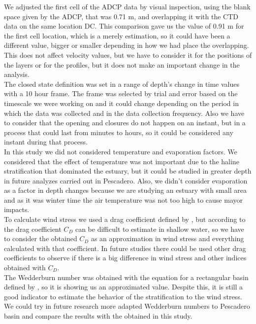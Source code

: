 \documentclass[tesis.tex]{subfiles}
\begin{document}
We adjusted the first cell of the ADCP data by visual inspection, using the blank space given by the ADCP, that was 0.71 m, and overlapping it with the CTD data on the same location DC. This comparison gave us the value of 0.91 m for the first cell location, which is a merely estimation, so it could have been a different value, bigger or smaller depending in how we had place the overlapping. This does not affect velocity values, but we have to consider it for the positions of the layers or for the profiles, but it does not make an important change in the analysis.\\

The closed state definition was set in a range of depth's change in time values with a 10 hour frame. The frame was selected by trial and error based on the timescale we were working on and it could change depending on the period in which the data was collected and in the data collection frequency. Also we have to consider that the opening and closures do not happen on an instant, but in a process that could last from minutes to hours, so it could be considered any instant during that process.\\ 

In this study we did not considered temperature and evaporation factors. We considered that the effect of temperature was not important due to the haline stratification that dominated the estuary, but it could be studied in greater depth in future analyzes carried out in Pescadero. Also, we didn't consider evaporation as a factor in depth changes because we are studying an estuary with small area and as it was winter time the air temperature was not too high to cause mayor impacts.\\

To calculate wind stress we used a drag coefficient defined by \cite{large1981open}, but according to \cite{paugam2021wind} the drag coefficient $C_D$ can be difficult to estimate in shallow water, so we have to consider the obtained $C_D$ as an approximation in wind stress and everything calculated with that coefficient. In future studies there could be used other drag coefficients to observe if there is a big difference in wind stress and other indices obtained with $C_D$.\\

The Wedderburn number was obtained with the equation for a rectangular basin defined by \cite{Monismith1985}, so it is showing us an approximated value. Despite this, it is still a good indicator to estimate the behavior of the stratification to the wind stress. We could try in future research more adapted Wedderburn numbers to Pescadero basin and compare the results with the obtained in this study.\\
\end{document}
